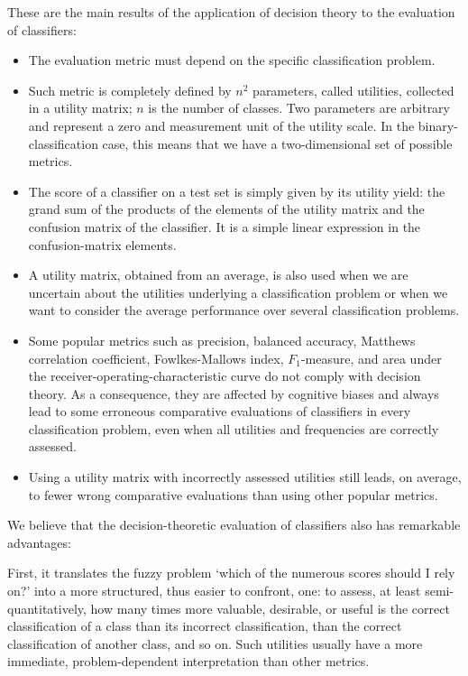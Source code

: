 \documentclass[\ifafour a4paper,12pt,\else a5paper,10pt,\fi%
onecolumn,oneside,article,%
british%
]{memoir}
\theoremstyle{remark}
\theoremstyle{innote}
\renewcommand*{\|}[1][]{\nonscript\:#1\vert\nonscript\:\mathopen{}}
\begin{document}
These are the main results of the application of decision theory to the evaluation of classifiers:
\begin{itemize}[wide]
\item The evaluation metric must depend on the specific classification problem.
\item Such metric is completely defined by $n^{2}$ parameters, called utilities, collected in a utility matrix; $n$ is the number of classes. Two parameters are arbitrary and represent a zero and measurement unit of the utility scale. In the binary-classification case, this means that we have a two-dimensional set of possible metrics.
\item The score of a classifier on a test set is simply given by its utility yield: the grand sum of the products of the elements of the utility matrix and the confusion matrix of the classifier. It is a simple linear expression in the confusion-matrix elements.
\item A utility matrix, obtained from an average, is also used when we are uncertain about the utilities underlying a classification problem or when we want to consider the average performance over several classification problems.
\item Some popular metrics such as precision, balanced accuracy, Matthews correlation coefficient, Fowlkes-Mallows index, $F_{1}$-measure, and area under the receiver-operating-characteristic curve do not comply with decision theory. As a consequence, they are affected by cognitive biases and always lead to some erroneous comparative evaluations of classifiers in every classification problem, even when all utilities and frequencies are correctly assessed.
\item Using a utility matrix with incorrectly assessed utilities still leads, on average, to fewer wrong comparative evaluations than using other popular metrics.
\end{itemize}

We believe that the decision-theoretic evaluation of classifiers also has remarkable advantages:

First, it translates the fuzzy problem \enquote*{which of the numerous scores should I rely on?} into a more structured, thus easier to confront, one: to assess, at least semi-quantitatively, how many times more valuable, desirable, or useful is the correct classification of a class than its incorrect classification, than the correct classification of another class, and so on. Such utilities usually have a more immediate, problem-dependent interpretation than other metrics.
\end{document}
